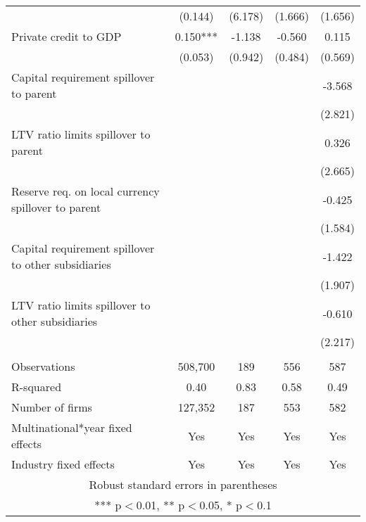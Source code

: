 \begin{tabular}{lcccc}
 & (0.144) & (6.178) & (1.666) & (1.656) \\
Private credit to GDP & 0.150*** & -1.138 & -0.560 & 0.115 \\
 & (0.053) & (0.942) & (0.484) & (0.569) \\
Capital requirement spillover to parent &  &  &  & -3.568 \\
 &  &  &  & (2.821) \\
LTV ratio limits spillover to parent &  &  &  & 0.326 \\
 &  &  &  & (2.665) \\
Reserve req. on local currency spillover to parent &  &  &  & -0.425 \\
 &  &  &  & (1.584) \\
Capital requirement spillover to other subsidiaries &  &  &  & -1.422 \\
 &  &  &  & (1.907) \\
LTV ratio limits spillover to other subsidiaries &  &  &  & -0.610 \\
 &  &  &  & (2.217) \\
 &  &  &  &  \\
Observations & 508,700 & 189 & 556 & 587 \\
R-squared & 0.40 & 0.83 & 0.58 & 0.49 \\
Number of firms & 127,352 & 187 & 553 & 582 \\
Multinational*year fixed effects & Yes & Yes & Yes & Yes \\
 Industry fixed effects & Yes & Yes & Yes & Yes \\ \hline
\multicolumn{5}{c}{ Robust standard errors in parentheses} \\
\multicolumn{5}{c}{ *** p$<$0.01, ** p$<$0.05, * p$<$0.1} \\
\end{tabular}
